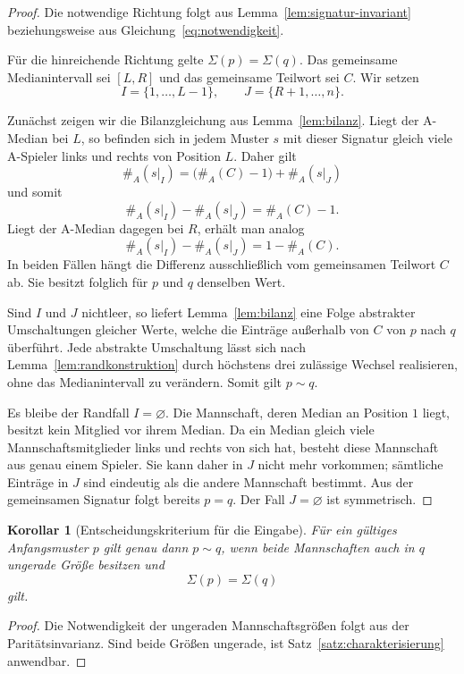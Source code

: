 \documentclass[12pt]{article}
\newtheorem{korollar}[satz]{Korollar}
\newcommand{\teamcount}[2]{\#_{#1}(#2)}
\begin{document}
\begin{proof}
Die notwendige Richtung folgt aus
Lemma~\ref{lem:signatur-invariant} beziehungsweise aus
Gleichung~\eqref{eq:notwendigkeit}.

Für die hinreichende Richtung gelte $\Sigma(p)=\Sigma(q)$. Das gemeinsame
Medianintervall sei $[L,R]$ und das gemeinsame Teilwort sei $C$. Wir setzen
\[
I=\{1,\ldots,L-1\},
\qquad
J=\{R+1,\ldots,n\}.
\]

Zunächst zeigen wir die Bilanzgleichung aus Lemma~\ref{lem:bilanz}. Liegt der
A-Median bei $L$, so befinden sich in jedem Muster $s$ mit dieser Signatur
gleich viele A-Spieler links und rechts von Position $L$. Daher gilt
\[
\teamcount{A}{s|_I}
=
\bigl(\teamcount{A}{C}-1\bigr)+\teamcount{A}{s|_J}
\]
und somit
\[
\teamcount{A}{s|_I}-\teamcount{A}{s|_J}
=\teamcount{A}{C}-1.
\]
Liegt der A-Median dagegen bei $R$, erhält man analog
\[
\teamcount{A}{s|_I}-\teamcount{A}{s|_J}
=1-\teamcount{A}{C}.
\]
In beiden Fällen hängt die Differenz ausschließlich vom gemeinsamen Teilwort
$C$ ab. Sie besitzt folglich für $p$ und $q$ denselben Wert.

Sind $I$ und $J$ nichtleer, so liefert Lemma~\ref{lem:bilanz} eine Folge
abstrakter Umschaltungen gleicher Werte, welche die Einträge außerhalb von
$C$ von $p$ nach $q$ überführt. Jede abstrakte Umschaltung lässt sich nach
Lemma~\ref{lem:randkonstruktion} durch höchstens drei zulässige Wechsel
realisieren, ohne das Medianintervall zu verändern. Somit gilt $p\sim q$.

Es bleibe der Randfall $I=\varnothing$. Die Mannschaft, deren Median an
Position $1$ liegt, besitzt kein Mitglied vor ihrem Median. Da ein Median
gleich viele Mannschaftsmitglieder links und rechts von sich hat, besteht
diese Mannschaft aus genau einem Spieler. Sie kann daher in $J$ nicht mehr
vorkommen; sämtliche Einträge in $J$ sind eindeutig als die andere
Mannschaft bestimmt. Aus der gemeinsamen Signatur folgt bereits $p=q$. Der
Fall $J=\varnothing$ ist symmetrisch.
\end{proof}

\begin{korollar}[Entscheidungskriterium für die Eingabe]
Für ein gültiges Anfangsmuster $p$ gilt genau dann $p\sim q$, wenn beide
Mannschaften auch in $q$ ungerade Größe besitzen und
\[
\Sigma(p)=\Sigma(q)
\]
gilt.
\end{korollar}

\begin{proof}
Die Notwendigkeit der ungeraden Mannschaftsgrößen folgt aus der
Paritätsinvarianz. Sind beide Größen ungerade, ist
Satz~\ref{satz:charakterisierung} anwendbar.
\end{proof}
\end{document}
